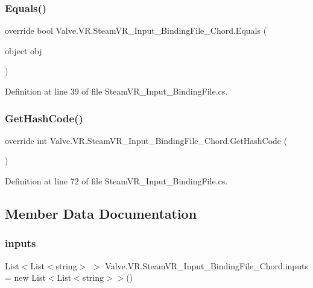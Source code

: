 \subsubsection{\texorpdfstring{Equals()}{Equals()}}
{\footnotesize\ttfamily override bool Valve.\+V\+R.\+Steam\+V\+R\+\_\+\+Input\+\_\+\+Binding\+File\+\_\+\+Chord.\+Equals (\begin{DoxyParamCaption}\item[{object}]{obj }\end{DoxyParamCaption})}



Definition at line 39 of file Steam\+V\+R\+\_\+\+Input\+\_\+\+Binding\+File.\+cs.

\mbox{\label{class_valve_1_1_v_r_1_1_steam_v_r___input___binding_file___chord_ac5807fbe8c6cb43cee99049c0dfa13d3}} 
\subsubsection{\texorpdfstring{GetHashCode()}{GetHashCode()}}
{\footnotesize\ttfamily override int Valve.\+V\+R.\+Steam\+V\+R\+\_\+\+Input\+\_\+\+Binding\+File\+\_\+\+Chord.\+Get\+Hash\+Code (\begin{DoxyParamCaption}{ }\end{DoxyParamCaption})}



Definition at line 72 of file Steam\+V\+R\+\_\+\+Input\+\_\+\+Binding\+File.\+cs.



\subsection{Member Data Documentation}
\mbox{\label{class_valve_1_1_v_r_1_1_steam_v_r___input___binding_file___chord_a6328c4b8feea5a400cb7be8a379b3313}} 
\subsubsection{\texorpdfstring{inputs}{inputs}}
{\footnotesize\ttfamily List$<$List$<$string$>$ $>$ Valve.\+V\+R.\+Steam\+V\+R\+\_\+\+Input\+\_\+\+Binding\+File\+\_\+\+Chord.\+inputs = new List$<$List$<$string$>$$>$()}



